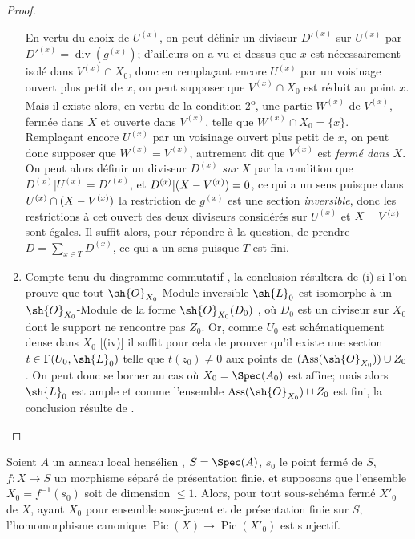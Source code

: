 \begin{proof}
\begin{enumerate}[label=(\roman*)]
En vertu du choix de $U^{(x)}$, on peut définir un diviseur $D'^{(x)}$ sur $U^{(x)}$ par $D'^{(x)}=\operatorname{div}(g^{(x)})$;
d'ailleurs on a vu ci-dessus que $x$ est nécessairement isolé dans $V^{(x)}\cap X_0$, donc en remplaçant encore $U^{(x)}$ par un voisinage ouvert plus petit de $x$, on peut supposer que $V^{(x)}\cap X_0$ est réduit au point $x$.
Mais il existe alors, en vertu de la condition 2\textsuperscript{o}, une partie $W^{(x)}$ de $V^{(x)}$, fermée dans $X$ et ouverte dans $V^{(x)}$, telle que $W^{(x)}\cap X_0=\{x\}$.
Remplaçant encore $U^{(x)}$ par un voisinage ouvert plus petit de $x$, on peut donc supposer
que $W^{(x)}=V^{(x)}$, autrement dit que $V^{(x)}$ est \emph{fermé dans} $X$.
On peut alors définir un diviseur $D^{(x)}$ \emph{sur} $X$ par la condition que $D^{(x)}|U^{(x)}=D'^{(x)}$, et $D^{(x)}|(X\setmin V^{(x)})=0$, ce qui a un sens puisque dans $U^{(x)}\cap(X\setmin V^{(x)})$ la restriction de $g^{(x)}$ est une section \emph{inversible}, donc les restrictions à cet ouvert des deux diviseurs considérés sur $U^{(x)}$ et $X\setmin V^{(x)}$ sont égales.
Il suffit alors, pour répondre à la question, de prendre $D=\sum_{x\in T}D^{(x)}$, ce qui a un sens puisque $T$ est fini.

  \item Compte tenu du diagramme commutatif , la conclusion résultera de (i) si l'on prouve que tout $\sh{O}_{X_0}$-Module inversible $\sh{L}_0$ est isomorphe à un $\sh{O}_{X_0}$-Module de la forme $\sh{O}_{X_0}(D_0)$ , où $D_0$ est un diviseur sur $X_0$ dont le support ne rencontre pas $Z_0$.
Or, comme $U_0$ est schématiquement dense dans $X_0$ [(iv)] il suffit pour cela de prouver qu'il existe une section $t\in\Gamma(U_0,\sh{L}_0)$ telle que $t(z_0)\neq0$ aux points de $(\operatorname{Ass}(\sh{O}_{X_0}))\cup Z_0$ .
On peut donc se borner au cas où $X_0=\Spec(A_0)$ est affine;
mais alors $\sh{L}_0$ est ample  et comme l'ensemble $\operatorname{Ass}(\sh{O}_{X_0})\cup Z_0$ est fini, la conclusion résulte de .
\end{enumerate}
\end{proof}

\begin{corollary}[21.9.12]
\label{IV.21.9.12}
Soient $A$ un anneau local hensélien , $S=\Spec(A)$, $s_0$ le point fermé de $S$, $f:X\to S$ un morphisme séparé de présentation finie, et supposons que l'ensemble $X_0=f^{-1}(s_0)$ soit de dimension $\leq1$.
Alors, pour tout sous-schéma fermé $X'_0$ de $X$, ayant $X_0$ pour ensemble sous-jacent et de présentation finie sur $S$, l'homomorphisme canonique  $\operatorname{Pic}(X)\to\operatorname{Pic}(X'_0)$ est surjectif.
\end{corollary}

